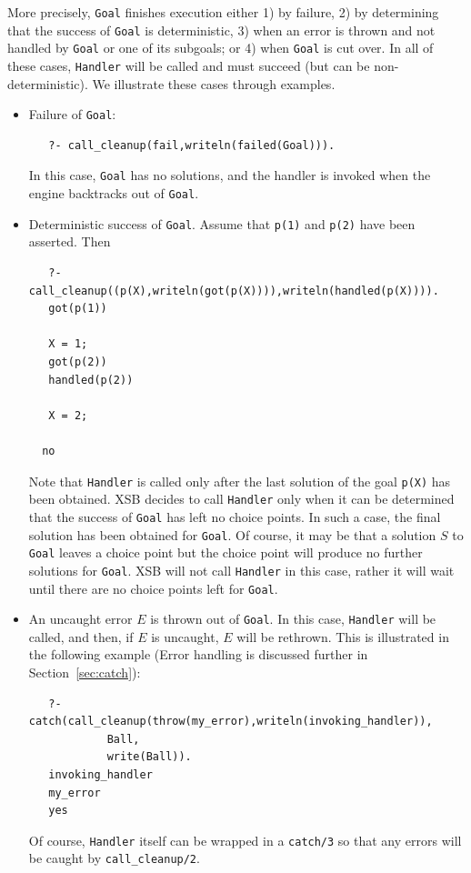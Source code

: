 \begin{description}
\begin{itemize}
More precisely, {\tt Goal} finishes execution either 1) by failure, 2)
by determining that the success of {\tt Goal} is deterministic, 3)
when an error is thrown and not handled by {\tt Goal} or one of its
subgoals; or 4) when {\tt Goal} is cut over.  In all of these cases,
{\tt Handler} will be called and must succeed (but can be non-deterministic).
We illustrate these cases through examples.
\begin{itemize}
\item Failure of {\tt Goal}:
\begin{verbatim}
   ?- call_cleanup(fail,writeln(failed(Goal))).
\end{verbatim}
In this case, {\tt Goal} has no solutions, and the handler is invoked
when the engine backtracks out of {\tt Goal}.
%
\item Deterministic success of {\tt Goal}.  Assume that {\tt p(1)} and
  {\tt p(2)} have been asserted.  Then
\begin{verbatim}
   ?- call_cleanup((p(X),writeln(got(p(X)))),writeln(handled(p(X)))).
   got(p(1))

   X = 1;
   got(p(2))
   handled(p(2))

   X = 2;

  no
\end{verbatim}
Note that {\tt Handler} is called only after the last solution of the
goal {\tt p(X)} has been obtained.  XSB decides to call {\tt Handler}
only when it can be determined that the success of {\tt Goal} has left
no choice points.  In such a case, the final solution has been
obtained for {\tt Goal}.  Of course, it may be that a solution $S$ to
{\tt Goal} leaves a choice point but the choice point will produce no
further solutions for {\tt Goal}.  XSB will not call {\tt Handler} in
this case, rather it will wait until there are no choice points left
for {\tt Goal}.

\item An uncaught error $E$ is thrown out of {\tt Goal}.  In this
  case, {\tt Handler} will be called, and then, if $E$ is uncaught,
  $E$ will be rethrown.  This is illustrated in the following example
  (Error handling is discussed further in Section~\ref{sec:catch}):
\begin{verbatim}
   ?- catch(call_cleanup(throw(my_error),writeln(invoking_handler)),
            Ball,
            write(Ball)).
   invoking_handler
   my_error
   yes
\end{verbatim}
Of course, {\tt Handler} itself can be wrapped in a {\tt catch/3} so
that any errors will be caught by {\tt call\_cleanup/2}.


\end{itemize}
\end{itemize}
\end{description}
